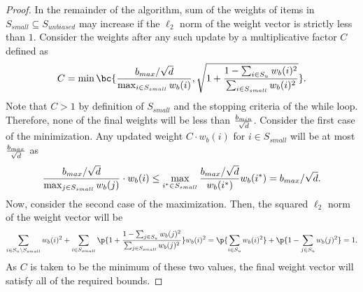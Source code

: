 \begin{proof}
In the remainder of the algorithm, sum of the weights of items in $S_{small} \subseteq S_{unbiased}$ may increase if the $\ell_2$ norm of the weight vector is strictly less than $1$.
Consider the weights after any such update by a multiplicative factor $C$ defined as
\begin{equation*}
    C = \min\bc{
    \frac{\bmax/\sqrt{d}}{\max_{i \in S_{small}} w_b(i)},
    \sqrt{1 + \frac{1 - \sum_{i \in S_u} w_b(i)^2}{\sum_{i \in S_{small}} w_b(i)^2}}}.
\end{equation*}
Note that $C > 1$ by definition of $S_{small}$ and the stopping criteria of the while loop. Therefore, none of the final weights will be less than $\frac{b_{min}}{\sqrt{d}}$.
Consider the first case of the minimization.
Any updated weight $C \cdot w_b(i)$ for $i \in S_{small}$ will be at most $\frac{b_{max}}{\sqrt{d}}$ as
\begin{equation*}
    \frac{b_{max}/\sqrt{d}}{\max_{j \in S_{small}} w_b(j)} \cdot w_b(i)
    \leq 
    \max_{i^* \in S_{small}} \frac{b_{max}/\sqrt{d}}{w_b(i^*)} w_b(i^*)
    = b_{max}/\sqrt{d}.
\end{equation*}
Now, consider the second case of the maximization.
Then, the squared $\ell_2$ norm of the weight vector will be
\begin{equation*}
    \sum_{i \in S_u \setminus S_{small}} w_b(i)^2
    + \sum_{i \in S_{small}} \p{1 + \frac{1 - \sum_{j \in S_u} w_b(j)^2}{\sum_{j \in S_{small}} w_b(j)^2}} w_b(i)^2
    = \p{\sum_{i \in S_u} w_b(i)^2} + \p{1 - \sum_{j \in S_u} w_b(j)^2}
    = 1.
\end{equation*}
As $C$ is taken to be the minimum of these two values, the final weight vector will satisfy all of the required bounds.
\end{proof}


